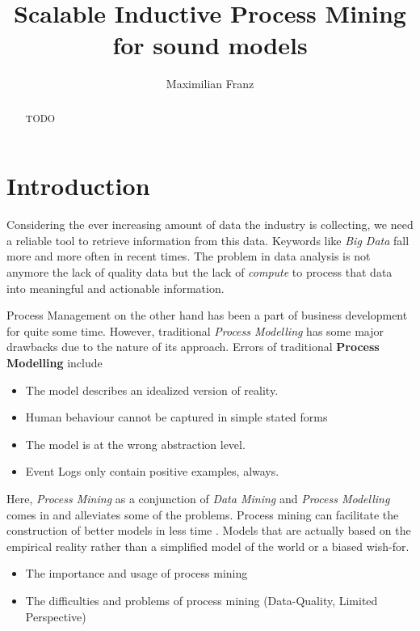 \documentclass[a4paper]{IEEEtran}
\title{Scalable Inductive Process Mining for sound models}
\author{Maximilian Franz}
\begin{document}
\maketitle

\begin{abstract}
TODO
\end{abstract}

\section{Introduction}
Considering the ever increasing amount of data \cite{manyika2011bigdata} \cite{hilbert2011worldcapacity}
the industry is collecting, we need a reliable tool to retrieve information from this data. Keywords like \textit{Big Data} fall more and more often in recent times. The problem in data analysis is not anymore the lack of quality data but the lack of \textit{compute} to process that data into meaningful and actionable information. 

Process Management on the other hand has been a part of business development for quite some time. However, traditional \textit{Process Modelling} has some major drawbacks due to the nature of its approach. 
Errors of traditional \textbf{Process Modelling} include
\begin{itemize}
    \item The model describes an idealized version of reality.
    \item Human behaviour cannot be captured in simple stated forms
    \item The model is at the wrong abstraction level. 
    \item Event Logs only contain positive examples, always.
\end{itemize}
Here, \textit{Process Mining} as a conjunction of \textit{Data Mining} and \textit{Process Modelling} comes in and alleviates some of the problems. 
Process mining can facilitate the construction of better models in less time \cite{process_mining}. Models that are actually based on the empirical reality rather than a simplified model of the world or a biased wish-for. 


\begin{itemize}
    \item The importance and usage of process mining 
    \item The difficulties and problems of process mining (Data-Quality, Limited Perspective)
\end{itemize}
\end{document}
